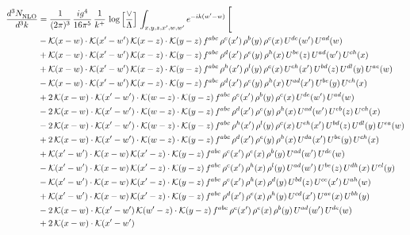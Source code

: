\documentclass[9pt]{article}
\numberwithin{equation}{section}
\begin{document}
\begin{align}
     \frac{d^{3}N_{\rm NLO}^{\rm}}{d^{3}k}  & = \frac{1}{(2\pi)^{3}}\, \frac{ig^{4}}{16\pi^{5}}\, \frac{1}{k^{+}}\, \log{\left[\frac{\vee}{\Lambda}\right]}\, \int_{x,y,z,x^{\prime},w,w^{\prime}}e^{-ik(w^{\prime}-w)}\, \Bigg[\notag \\ & -\mathcal{K}(x-w)\cdot \mathcal{K}(x'-w')\, \mathcal{K}(x-z)\cdot \mathcal{K}(y-z)\, f^{abc}\, \rho^{e}(x')\,\rho^{b}(y)\,\rho^{c}(x)\,U^{de}(w')\,U^{ad}(w)\notag \\ & + \mathcal{K}(x-w)\cdot \mathcal{K}(x'-w')\, \mathcal{K}(x-z)\cdot \mathcal{K}(y-z)\, f^{abc}\, \rho^{d}(x')\,\rho^{e}(y)\,\rho^{h}(x)\,U^{be}(z)\,U^{ad}(w')\,U^{ch}(x)\notag \\ & + \mathcal{K}(x-w)\cdot \mathcal{K}(x'-w')\, \mathcal{K}(x-z)\cdot \mathcal{K}(y-z)\, f^{abc}\, \rho^{h}(x')\,\rho^{l}(y)\,\rho^{c}(x)\,U^{eh}(x')\,U^{bd}(z)\,U^{dl}(y)\,U^{ae}(w)\notag \\ & -\mathcal{K}(x-w)\cdot \mathcal{K}(x'-w')\, \mathcal{K}(x-z)\cdot \mathcal{K}(y-z)\, f^{abc}\, \rho^{d}(x')\,\rho^{e}(y)\,\rho^{h}(x)\,U^{ad}(x')\,U^{be}(y)\,U^{ch}(x)\notag \\ & + 2\,\mathcal{K}(x-w)\cdot \mathcal{K}(x'-w')\cdot \mathcal{K}(w-z)\cdot \mathcal{K}(y-z)\, f^{abc}\, \rho^{e}(x')\,\rho^{b}(y)\,\rho^{c}(x)\,U^{de}(w')\,U^{ad}(w)\notag \\ & - 2\,\mathcal{K}(x-w)\cdot \mathcal{K}(x'-w')\cdot \mathcal{K}(w-z)\cdot \mathcal{K}(y-z)\, f^{abc}\, \rho^{d}(x')\,\rho^{e}(y)\,\rho^{h}(x)\,U^{ad}(w')\,U^{eb}(z)\,U^{ch}(x)\notag \\ & - 2\,\mathcal{K}(x-w)\cdot \mathcal{K}(x'-w')\cdot \mathcal{K}(w-z)\cdot \mathcal{K}(y-z)\, f^{abc}\, \rho^{h}(x')\,\rho^{l}(y)\,\rho^{c}(x)\,U^{eh}(x')\,U^{bd}(z)\,U^{dl}(y)\,U^{ea}(w)\notag \\ &  + 2\,\mathcal{K}(x-w)\cdot \mathcal{K}(x'-w')\cdot \mathcal{K}(w-z)\cdot \mathcal{K}(y-z)\, f^{abc}\, \rho^{d}(x')\,\rho^{e}(y)\,\rho^{h}(x)\,U^{da}(x')\,U^{be}(y)\,U^{ch}(x)\notag \\ & + \mathcal{K}(x'-w')\cdot \mathcal{K}(x-w)\, \mathcal{K}(x'-z)\cdot \mathcal{K}(y-z)\, f^{abc}\,\rho^{c}(x')\,\rho^{e}(x)\,\rho^{b}(y)\, U^{ad}(w')\,U^{de}(w)\notag \\ & -\mathcal{K}(x'-w')\cdot \mathcal{K}(x-w)\, \mathcal{K}(x'-z)\cdot \mathcal{K}(y-z)\, f^{abc}\,\rho^{c}(x')\,\rho^{h}(x)\,\rho^{l}(y)\, U^{ad}(w')\,U^{be}(z)\,U^{dh}(x)\,U^{el}(y)\notag \\ & -\mathcal{K}(x'-w')\cdot \mathcal{K}(x-w)\, \mathcal{K}(x'-z)\cdot \mathcal{K}(y-z)\, f^{abc}\,\rho^{e}(x')\,\rho^{h}(x)\,\rho^{d}(y)\, U^{bd}(z)\,U^{ce}(x')\,U^{ah}(w)\notag \\ & +\mathcal{K}(x'-w')\cdot \mathcal{K}(x-w)\, \mathcal{K}(x'-z)\cdot \mathcal{K}(y-z)\, f^{abc}\,\rho^{d}(x')\,\rho^{e}(x)\,\rho^{h}(y)\, U^{cd}(x')\,U^{ae}(x)\,U^{bh}(y)\notag \\ & -2\, \mathcal{K}(x-w)\cdot \mathcal{K}(x'-w')\, \mathcal{K}(w'-z)\cdot \mathcal{K}(y-z)\, f^{abc}\,\rho^{c}(x')\,\rho^{e}(x)\,\rho^{b}(y)\,U^{ad}(w')\,U^{de}(w)\notag \\ & +2\, \mathcal{K}(x-w)\cdot \mathcal{K}(x'-w')\, 
\end{align}
\end{document}

